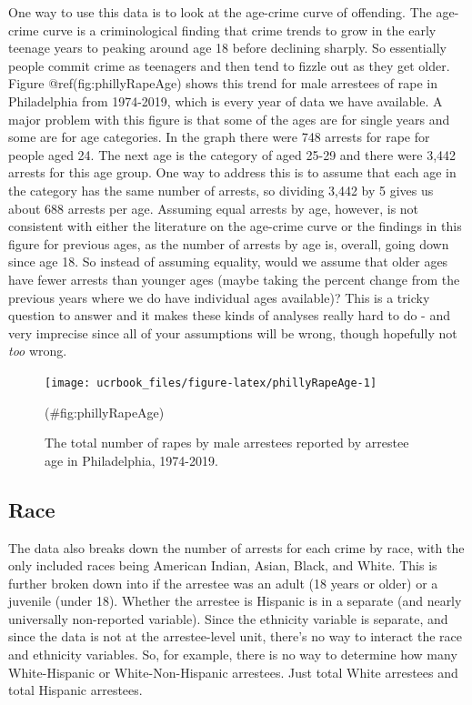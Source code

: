 \documentclass[
  12pt,
  openany]{book}
\begin{document}
One way to use this data is to look at the age-crime curve of offending. The age-crime curve is a criminological finding that crime trends to grow in the early teenage years to peaking around age 18 before declining sharply. So essentially people commit crime as teenagers and then tend to fizzle out as they get older. Figure @ref(fig:phillyRapeAge) shows this trend for male arrestees of rape in Philadelphia from 1974-2019, which is every year of data we have available. A major problem with this figure is that some of the ages are for single years and some are for age categories. In the graph there were 748 arrests for rape for people aged 24. The next age is the category of aged 25-29 and there were 3,442 arrests for this age group. One way to address this is to assume that each age in the category has the same number of arrests, so dividing 3,442 by 5 gives us about 688 arrests per age. Assuming equal arrests by age, however, is not consistent with either the literature on the age-crime curve or the findings in this figure for previous ages, as the number of arrests by age is, overall, going down since age 18. So instead of assuming equality, would we assume that older ages have fewer arrests than younger ages (maybe taking the percent change from the previous years where we do have individual ages available)? This is a tricky question to answer and it makes these kinds of analyses really hard to do - and very imprecise since all of your assumptions will be wrong, though hopefully not \emph{too} wrong.

\begin{figure}

{\centering \texttt{[image: ucrbook\_files/figure-latex/phillyRapeAge-1]} 

}

\caption{The total number of rapes by male arrestees reported by arrestee age in Philadelphia, 1974-2019.}(\#fig:phillyRapeAge)
\end{figure}

\hypertarget{race}{%
\subsection{Race}\label{race}}

The data also breaks down the number of arrests for each crime by race, with the only included races being American Indian, Asian, Black, and White. This is further broken down into if the arrestee was an adult (18 years or older) or a juvenile (under 18). Whether the arrestee is Hispanic is in a separate (and nearly universally non-reported variable). Since the ethnicity variable is separate, and since the data is not at the arrestee-level unit, there's no way to interact the race and ethnicity variables. So, for example, there is no way to determine how many White-Hispanic or White-Non-Hispanic arrestees. Just total White arrestees and total Hispanic arrestees.
\end{document}
